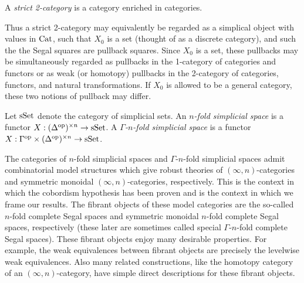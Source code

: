 \documentclass{amsart}
\begin{document}
\begin{example}
	A {\em strict 2-category} is a category enriched in categories.
\end{example}

Thus a strict 2-category may equivalently be regarded as a simplical object with values in $\mathrm{Cat}$, such that $X_0$ is a set (thought of as a discrete category), and such the the Segal squares are pullback squares. Since $X_0$ is a set, these pullbacks may be simultaneously regarded as pullbacks in the 1-category of categories and functors or as weak (or homotopy) pullbacks in the 2-category of categories, functors, and natural transformations. If $X_0$ is allowed to be a general category, these two notions of pullback may differ. 

\begin{definition}
	Let $\mathrm{sSet}$ denote the category of simplicial sets. An {\em $n$-fold simplicial space} is a functor $X: (\Delta^\textrm{op})^{\times n} \to \mathrm{sSet}$. A {\em $\Gamma$-$n$-fold simplicial space} is a functor $X: \Gamma^\textrm{op} \times (\Delta^\textrm{op})^{\times n} \to \mathrm{sSet}$.
\end{definition}

The categories of $n$-fold simplicial spaces and $\Gamma$-$n$-fold simplicial spaces admit combinatorial model structures which give robust theories of $(\infty, n)$-categories and symmetric monoidal $(\infty, n)$-categories, respectively. This is the context in which the cobordism hypothesis has been proven and is the context in which we frame our results. The fibrant objects of these model categories are the so-called $n$-fold complete Segal spaces and symmetric monoidal $n$-fold complete Segal spaces, respectively (these later are sometimes called special $\Gamma$-$n$-fold complete Segal spaces).
These fibrant objects enjoy many desirable properties. For example, the weak equivalences between fibrant objects are precisely the levelwise weak equivalences. Also many related constructions, like the homotopy category of an $(\infty, n)$-category, have simple direct descriptions for these fibrant objects. 
\end{document}
